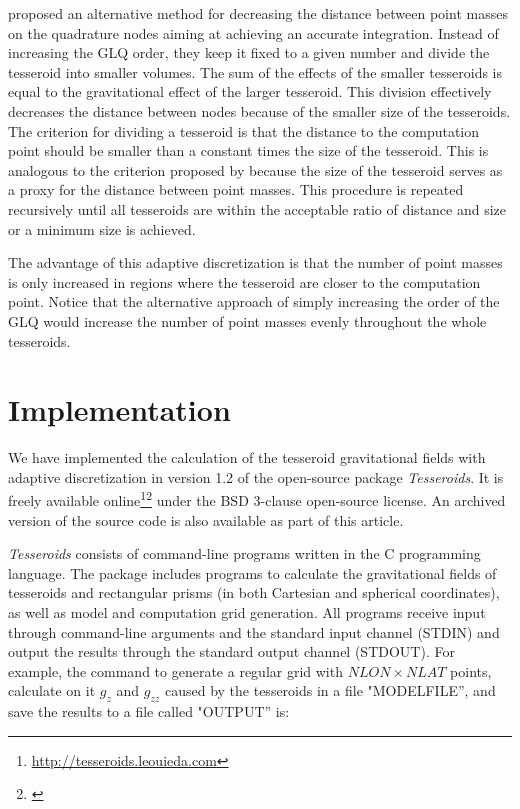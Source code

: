 \documentclass[paper,twocolumn,twoside]{geophysics}
\begin{document}
\citet{Li2011} proposed an alternative method
for decreasing the distance between point masses on the quadrature nodes
aiming at achieving an accurate integration.
Instead of increasing the GLQ order,
they keep it fixed to a given number
and divide the tesseroid into smaller volumes.
The sum of the effects of the smaller tesseroids
is equal to the gravitational effect of the larger tesseroid.
This division effectively decreases
the distance between nodes because
of the smaller size of the tesseroids.
The criterion for dividing a tesseroid is that the distance to the computation point
should be smaller than a constant times the size of the tesseroid.
This is analogous to the criterion proposed by \citet{Ku1977}
because the size of the tesseroid serves as a proxy
for the distance between point masses.
This procedure is repeated recursively
until all tesseroids are within the acceptable
ratio of distance and size or a minimum size is achieved.


The advantage of this adaptive discretization is
that the number of point masses is only increased
in regions where the tesseroid are
closer to the computation point.
Notice that the alternative approach of
simply increasing the order of the GLQ
would increase the number of point masses
evenly throughout the whole tesseroids.

\section{Implementation}

We have implemented the calculation of
the tesseroid gravitational fields
with adaptive discretization
in version 1.2 of the open-source package \emph{Tesseroids}.
It is freely available online\footnote{
\url{http://tesseroids.leouieda.com}}\footnote{
\url{}}
under the BSD 3-clause open-source license.
An archived version of the source code
is also available as part of this article.

\emph{Tesseroids} consists of command-line programs
written in the C programming language.
The package includes programs to calculate
the gravitational fields of tesseroids and
rectangular prisms (in both Cartesian and spherical coordinates),
as well as model and computation grid generation.
All programs receive input through
command-line arguments and the standard input channel (STDIN)
and output the results through the standard output channel (STDOUT).
For example,
the command to generate a regular grid with $NLON \times NLAT$ points,
calculate on it $g_z$ and $g_{zz}$ caused by
the tesseroids in a file "MODELFILE'',
and save the results to a file called "OUTPUT''
is:
\end{document}
